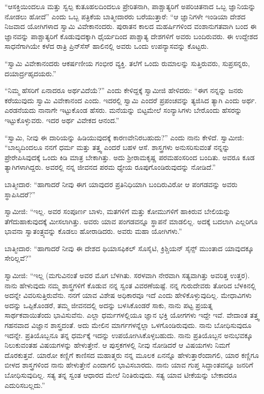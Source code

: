  “ಆಸಕ್ತಿಯಿಂದಲೂ ಮತ್ತು ಸ್ವಲ್ಪ ಕುತೂಹಲದಿಂದಲೂ ಪ್ರೇರಿತನಾಗಿ, ಪಾಶ್ಚಾತ್ಯರಿಗೆ ಅಪರಿಚಿತನಾದ ಒಬ್ಬ ಜ್ಞಾನಿಯನ್ನು ನೋಡಲು ಹೋದೆ” ಎಂದು ಒಬ್ಬ ಪತ್ರಿಕೆಯ ಬಾತ್ಮೀದಾರರು ಬರೆಯುತ್ತಾರೆ: “ಆ ಜ್ಞಾನಿಗಳೇ ಇಂಡಿಯಾ ದೇಶದ ನಿಜವಾದ ಯೋಗಿಗಳಾದ ಸ್ವಾಮಿ ವಿವೇಕಾನಂದರು. ಪುರಾತನ ಕಾಲದ ಮಹರ್ಷಿಗಳಿಂದ ವಂಶಾನುಗತವಾಗಿ ಬಂದ ಈ ಜ್ಞಾನವನ್ನು ಪಾಶ್ಚಾತ್ಯರಿಗೆ ಕೊಡುವುದಕ್ಕಾಗಿ ಧೈರ್ಯದಿಂದ ಪಾಶ್ಚಾತ್ಯ ದೇಶಗಳಿಗೆ ಅವರು ಬಂದಿರುವರು. ಈ ಉದ್ದೇಶದ ಸಾಧನೆಗಾಗಿಯೇ ಕಳೆದ ರಾತ್ರಿ ಪ್ರಿನ್‍ಸೆಸ್ ಹಾಲಿನಲ್ಲಿ ಅವರು ಒಂದು ಉಪನ್ಯಾಸವನ್ನು ಕೊಟ್ಟರು. 

 “ಸ್ವಾಮಿ ವಿವೇಕಾನಂದರು ಆಕರ್ಷಣೀಯ ಗಂಭೀರ ವ್ಯಕ್ತಿ. ತಲೆಗೆ ಒಂದು ರುಮಾಲನ್ನು ಸುತ್ತಿರುವರು, ಸುಪ್ರಸನ್ನರು, ದಯಾರ್ದ್ರಹೃದಯರು.” 

 “ನಿಮ್ಮ ಹೆಸರಿಗೆ ಏನಾದರೂ ಅರ್ಥವಿದೆಯೆ?” ಎಂದು ಕೇಳಿದ್ದಕ್ಕೆ ಸ್ವಾಮೀಜಿ ಹೇಳಿದರು: “ಈಗ ನನ್ನನ್ನು ಜನರು ಕರೆಯುವುದು ಸ್ವಾಮಿ ವಿವೇಕಾನಂದ ಎಂದು. ಇದರಲ್ಲಿ ಸ್ವಾಮಿ ಎಂದರೆ ಪ್ರಪಂಚವನ್ನು ತ್ಯಜಿಸಿದ ತ್ಯಾಗಿ ಎಂದು ಅರ್ಥ. ಎರಡನೆಯದು ನಾನಾಗೇ ಇಟ್ಟುಕೊಂಡ ಹೆಸರು. ಮನೆಯನ್ನು ಬಿಟ್ಟಮೇಲೆ ಸಂನ್ಯಾಸಿಗಳು ಬೇರೊಂದು ಹೆಸರನ್ನು ಇಟ್ಟುಕೊಳ್ಳುವರು. ಇದರ ಅರ್ಥ ವಿವೇಕದ ಆನಂದ.” 

 “ಸ್ವಾಮಿ, ನೀವು ಈ ದಾರಿಯನ್ನು ಹಿಡಿಯುವುದಕ್ಕೆ ಕಾರಣವೇನಿರಬಹುದು?” ಎಂದು ನಾನು ಕೇಳಿದೆ. ಸ್ವಾಮೀಜಿ: “ಬಾಲ್ಯದಿಂದಲೂ ನನಗೆ ಧರ್ಮ ಮತ್ತು ತತ್ತ್ವ ಎಂದರೆ ಬಹಳ ಆಸೆ. ಶಾಸ್ತ್ರಗಳು ಅನುಸರಿಸುವಂತೆ ನನ್ನನ್ನು ಪ್ರೇರೇಪಿಸಿವುದಕ್ಕೆ ಒಂದು ಕಿಡಿ ಮಾತ್ರ ಬೇಕಾಗಿತ್ತು. ಅದು ಶ‍್ರೀರಾಮಕೃಷ್ಣ ಪರಮಹಂಸರಿಂದ ಬಂದಿತು. ಅವರೂ ಕೂಡ ತ್ಯಾಗಿಗಳಾಗಿದ್ದರು. ಅವರಲ್ಲಿ ನನ್ನ ಜೀವನದ ಪರಮ ಧ್ಯೇಯ ರೂಪುಗೊಂಡಿರುವುದನ್ನು ನೋಡಿದೆ.” 

\vskip 3pt

 ಬಾತ್ಮೀದಾರ: “ಹಾಗಾದರೆ ನೀವು ಈಗ ಯಾವುದರ ಪ್ರತಿನಿಧಿಯಾಗಿ ಬಂದಿರುವಿರೋ ಆ ಪಂಗಡವನ್ನು ಅವರು ಸ್ಥಾಪಿಸಿದರೆ?” 

\vskip 3pt

 ಸ್ವಾಮೀಜಿ: “ಇಲ್ಲ. ಅವರ ಸಂಪೂರ್ಣ ಬಾಳು, ಮತಗಳಿಗೆ ಮತ್ತು ಕೋಮುಗಳಿಗೆ ಹಾಕಿರುವ ಬೇಲಿಯನ್ನು ತೆಗೆದುಹಾಕುವುದಕ್ಕೆ ಮೀಸಲಾಗಿತ್ತು. ಅವರು ಯಾವ ಪಂಗಡವನ್ನೂ ಸ್ಥಾಪನೆ ಮಾಡಲಿಲ್ಲ. ಅದಕ್ಕೆ ಬದಲಾಗಿ ಎಲ್ಲರಿಗೂ ಭಾವನಾ ಸ್ವಾತಂತ್ರ್ಯವನ್ನು ಕೊಡಲು ಹೋರಾಡಿದರು. ಅವರು ಮಹಾ ಯೋಗಿಗಳು.” 

\vskip 3pt

 ಬಾತ್ಮೀದಾರ: “ಹಾಗಾದರೆ ನೀವು ಈ ದೇಶದ ಥಿಯಾಸಫಿಕಲ್ ಸೊಸೈಟಿ, ಕ್ರಿಶ್ಚಿಯನ್ ಸೈನ್ಸ್ ಮುಂತಾದ ಯಾವುದಕ್ಕೂ ಸೇರಿಲ್ಲವೆ?” 

 ಸ್ವಾಮೀಜಿ: “ಇಲ್ಲ (ಮಗುವಿನಂತೆ ಅವರ ಮೊಗ ಬೆಳಗಿತು. ಸರಳವಾಗಿ ನೇರವಾಗಿ ಸತ್ಯವಾಗಿತ್ತು ಅವರಿತ್ತ ಉತ್ತರ). ನಾನು ಹೇಳುವುದು ನಮ್ಮ ಶಾಸ್ತ್ರಗಳಿಗೆ ಕೊಡುವ ನನ್ನ ಸ್ವಂತ ವಿವರಣೆಯಷ್ಟೆ. ನನ್ನ ಗುರುದೇವರು ತೋರಿದ ಬೆಳಕಿನಲ್ಲಿ ಅದನ್ನೇ ವಿವರಿಸುತ್ತಿರುವೆನು. ನನಗೆ ಯಾವ ವಿಶೇಷ ಅಧಿಕಾರವೂ ಇದೆ ಎಂದು ಹೇಳಿಕೊಳ್ಳುವುದಿಲ್ಲ. ಮೇಧಾವಿಗಳು ಅದನ್ನು ಒಪ್ಪಿಕೊಂಡರೆ, ತಮ್ಮ ಜೀವನದಲ್ಲಿ ಅದನ್ನು ಬಳಸಿಕೊಂಡರೆ ಸಾಕು, ನಾನು ಪಟ್ಟ ಪ್ರಯತ್ನ ಸಾರ್ಥಕವಾಯಿತೆಂದು ಭಾವಿಸುವೆನು. ಎಲ್ಲಾ ಧರ್ಮಗಳಲ್ಲಿಯೂ ಜ್ಞಾನ ಭಕ್ತಿ ಯೋಗಗಳು ಇದ್ದೇ ಇವೆ. ವೇದಾಂತ ತತ್ತ್ವ ಗಹನವಾದ ವಿಜ್ಞಾನ ಶಾಸ್ತ್ರದಂತೆ. ಅದು ಮೇಲಿನ ಮಾರ್ಗಗಳನ್ನೆಲ್ಲಾ ಒಳಗೊಂಡಿರುವುದು. ನಾನು ಬೋಧಿಸುವುದೂ ಇದನ್ನೇ. ಪ್ರತಿಯೊಬ್ಬನೂ ತನ್ನ ಧರ್ಮಕ್ಕೆ ಇದನ್ನು ಉಪಯೋಗಿಸಿಕೊಳ್ಳಬಹುದು. ನಾನು ಪ್ರತಿಯೊಬ್ಬನ ಅನುಭವಕ್ಕೂ ನಿಲುಕುವಂತಹ ವಿಷಯಗಳನ್ನು ಹೇಳುತ್ತೇನೆ. ಆ ಪುಸ್ತಕಗಳಲ್ಲಿ ನೀವು ನೋಡಿದರೆ ಆ ವಿಷಯಗಳು ನಿಮಗೆ ದೊರಕುತ್ತವೆ. ಯಾರೋ ಕಣ್ಣಿಗೆ ಕಾಣಿಸದ ಮಹಾತ್ಮರು ನನ್ನ ಮೂಲಕ ಏನನ್ನೊ ಹೇಳುತ್ತಾರೆಂದಾಗಲಿ, ಯಾರ ಕಣ್ಣಿಗೂ ಬೀಳದ ಶಾಸ್ತ್ರಗಳಿಂದ ನಾನು ಹೇಳುತ್ತೇನೆ ಎಂದಾಗಲಿ ಭಾವಿಸಬಾರದು. ನಾನು ಯಾವ ಗುಪ್ತ ಸಿದ್ಧಾಂತವನ್ನೂ ಜನರಿಗೆ ಬೋಧಿಸುವುದಿಲ್ಲ. ಸತ್ಯ ತನ್ನ ಸ್ವಂತ ಆಧಾರದ ಮೇಲೆ ನಿಂತಿರುವುದು. ಸತ್ಯ ಯಾವ ಟೀಕೆಯನ್ನು ಬೇಕಾದರೂ ಎದುರಿಸಬಲ್ಲದು.” 

